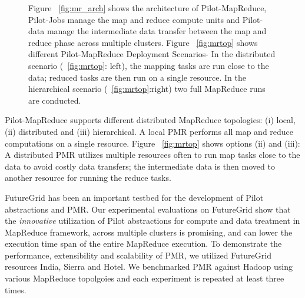 \documentclass[]{paper}
\begin{document}
\begin{figure}[t]
	\caption{ Figure ~\ref{fig:mr_arch} shows the architecture of Pilot-MapReduce, Pilot-Jobs manage the map and reduce compute  units and Pilot-data manage the intermediate data transfer between the map and reduce phase across multiple clusters. Figure ~\ref{fig:mrtop} shows different Pilot-MapReduce Deployment Scenarios- In the distributed scenario (~\ref{fig:mrtop}: left), the mapping tasks are run close to the data; reduced tasks are then run on a single resource. In the hierarchical scenario (~\ref{fig:mrtop}:right) two full MapReduce runs are conducted.  }
	\label{fig:combo}

\end{figure}

Pilot-MapReduce supports different distributed MapReduce topologies: (i) local, (ii) distributed and (iii) hierarchical. A local PMR performs all map and reduce computations on a single resource. Figure ~\ref{fig:mrtop} shows options (ii) and (iii): A distributed PMR utilizes multiple resources often to run map tasks close to the data to avoid costly data transfers; the intermediate data is then moved to another resource for running the reduce tasks. ~\cite{pmr-2012}


FutureGrid has been an important testbed for the development of Pilot abstractions and PMR.
Our experimental evaluations on FutureGrid show that the \textit{innovative} utilization of Pilot abstractions for compute and data treatment in MapReduce framework, across multiple clusters is promising, and can lower the execution time span of the entire MapReduce execution. To demonstrate the performance, extensibility and scalability of PMR, we utilized FutureGrid resources India, Sierra and Hotel.  We benchmarked PMR against Hadoop using various MapReduce topolgoies and each experiment is repeated at least three times.
\end{document}

